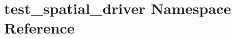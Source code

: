 \hypertarget{namespacetest__spatial__driver}{}\section{test\+\_\+spatial\+\_\+driver Namespace Reference}
\label{namespacetest__spatial__driver}
